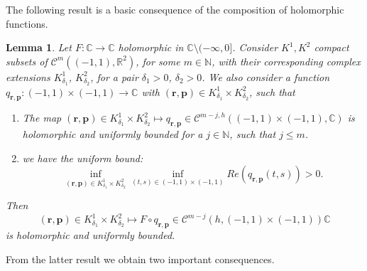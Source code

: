 \documentclass{article}
\newtheorem{lemma}[theorem]{Lemma}
\newcommand{\IC}{{\mathbb C}}
\newcommand{\IN}{{\mathbb N}}
\newcommand{\IR}{{\mathbb R}}
\newcommand{\bp}{{\bm p}}
\newcommand{\cmspace}[3]{\mathcal{C}^{#1} \left( #2, #3 \right)}
\newcommand{\cmspaceh}[4]{\mathcal{C}^{#1,#2} \left( #3, #4 \right)}
\newcommand{\br}{\bm{r}}
\begin{document}
The following result is a basic consequence of the composition of holomorphic functions. 

\begin{lemma}
\label{lemma:Fcircq}
Let $F :\IC \rightarrow \IC$ holomorphic in $\IC \setminus (-\infty,0]$. Consider $K^1, K^2$ compact subsets of $\cmspace{m}{(-1,1)}{\IR^2}$, for some $m \in \IN$, with their corresponding complex extensions $K^1_{\delta_1}$, $K^2_{\delta_2}$, for a pair $\delta_1 >0$, $\delta_2>0$. We also consider a function $q_{\br,\bp} :(-1,1)\times (-1,1) \rightarrow \IC$ with $(\br,\bp) \in K^1_{\delta_1} \times K^2_{\delta_2}$, such that  
\begin{enumerate}
\item 
The map $(\br,\bp)  \in K^1_{\delta_1} \times K^2_{\delta_2} \mapsto q_{\br,\bp} \in \cmspaceh{m-j}{h}{(-1,1)\times(-1,1)}{\IC}$ is holomorphic and uniformly bounded for a $j\in \IN$, such that $j\leq m$. 
\item we have the uniform bound: 
$$
\inf_{(\br,\bp) \in K_{\delta_1}^1 \times K_{\delta_2}^2} \inf_{(t,s) \in (-1,1)\times(-1,1)} Re( q_{\br,\bp}(t,s))>0.
$$
\end{enumerate}
Then 
$$(\br,\bp)  \in K^1_{\delta_1} \times K^2_{\delta_2} \mapsto  F \circ q_{\br,\bp} \in \cmspace{m-j}{h}{(-1,1)\times(-1,1)}{\IC}$$
is holomorphic and uniformly bounded.
\end{lemma} 
From the latter result we obtain two important consequences. 
\end{document}
